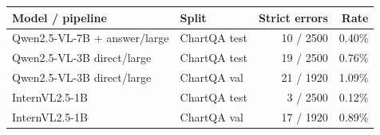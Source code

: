 \begin{tabular}{llrr}
\toprule
Model / pipeline & Split & Strict errors & Rate \\
\midrule
Qwen2.5-VL-7B + answer/large & ChartQA test & 10 / 2500 & 0.40\% \\
Qwen2.5-VL-3B direct/large & ChartQA test & 19 / 2500 & 0.76\% \\
Qwen2.5-VL-3B direct/large & ChartQA val & 21 / 1920 & 1.09\% \\
InternVL2.5-1B & ChartQA test & 3 / 2500 & 0.12\% \\
InternVL2.5-1B & ChartQA val & 17 / 1920 & 0.89\% \\
\bottomrule
\end{tabular}
